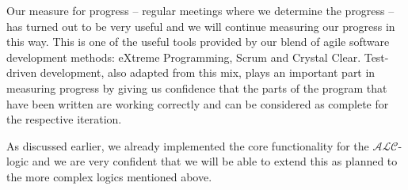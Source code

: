 Our measure for progress -- regular meetings
where we determine the progress -- has turned out to be very useful and we will continue
measuring our progress in this way. This is one of the useful tools provided by our 
blend of agile software development methods: eXtreme Programming, Scrum and Crystal Clear.
Test-driven development, also adapted from this mix, plays an important part in measuring
progress by giving us confidence that the parts of the program that have been written are
working correctly and can be considered as complete for the respective iteration.

As discussed earlier, we already implemented the
core functionality for the $\mathcal{ALC}$-logic and we are very confident that we will
be able to extend this as planned to the more complex logics mentioned above.

